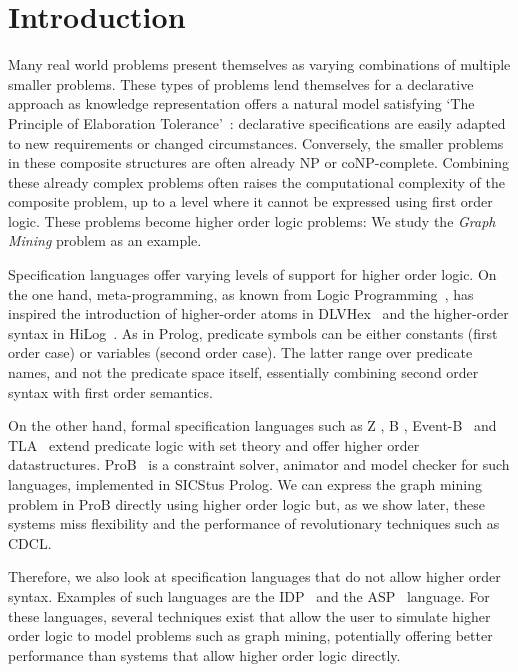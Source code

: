 
\section{Introduction}
Many real world problems present themselves as varying combinations of multiple smaller problems. 
These types of problems lend themselves for a declarative approach as knowledge representation offers a natural model satisfying `The Principle of Elaboration Tolerance'~\citep{elaboration_tolerance}: 
declarative specifications are easily adapted to new requirements or changed circumstances.
Conversely, the smaller problems in these composite structures are often already NP or coNP-complete.
Combining these already complex problems often raises the computational complexity of the composite problem, up to a level where it cannot be expressed using first order logic.
These problems become higher order logic problems: We study the \emph{Graph Mining} problem as an example.

Specification languages offer varying levels of support for higher order logic.
On the one hand, meta-programming, as known from Logic Programming~\citep{abramson1989meta}, has inspired the introduction of higher-order atoms in DLVHex~\citep{conf/ijcai/EiterIST05}  and the higher-order syntax in HiLog~\citep{chen1993hilog}.
As in Prolog, predicate symbols can be either constants (first order case) or variables (second order case). The latter range over predicate names, and not the predicate space itself, essentially combining second order syntax with first order semantics. 

On the other hand, formal specification languages such as Z \citep{Bowen:Z}, B \citep{Abrial:BBook}, Event-B~\citep{Abrial10} and TLA~\citep{books/aw/Lamport2002}
 extend predicate logic with set theory and offer higher order datastructures. ProB~\citep{journals/sttt/LeuschelB08} is a constraint solver, animator and model checker for such languages, implemented in SICStus Prolog.
We can express the graph mining problem in ProB directly using higher order logic but, as we show later, these systems miss flexibility and the performance of revolutionary techniques such as CDCL.

Therefore, we also look at specification languages that do not allow higher order syntax.
Examples of such languages are the IDP~\citep{WarrenBook/DeCatBBD16} and the ASP~\citep{conf/rweb/EiterIK09} language.
For these languages, several techniques exist that allow the user to simulate higher order logic to model problems such as graph mining, potentially offering better performance than systems that allow higher order logic directly.

